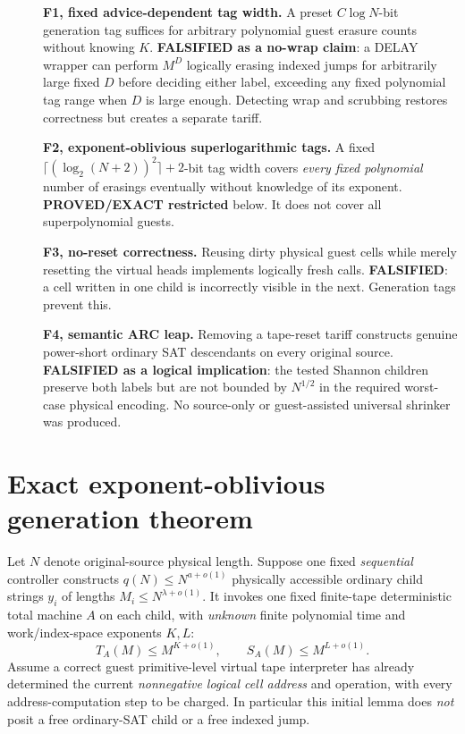 \documentclass[11pt]{article}
\begin{document}
\begin{description}
\item[] \textbf{F1, fixed advice-dependent tag width.} A preset $C\log N$-bit generation tag suffices for arbitrary polynomial guest erasure counts without knowing $K$. \textbf{FALSIFIED as a no-wrap claim}: a DELAY wrapper can perform $M^D$ logically erasing indexed jumps for arbitrarily large fixed $D$ before deciding either label, exceeding any fixed polynomial tag range when $D$ is large enough. Detecting wrap and scrubbing restores correctness but creates a separate tariff.
\item[] \textbf{F2, exponent-oblivious superlogarithmic tags.} A fixed $\lceil(\log_2(N+2))^2\rceil+2$-bit tag width covers \emph{every fixed polynomial} number of erasings eventually without knowledge of its exponent. \textbf{PROVED/EXACT restricted} below. It does not cover all superpolynomial guests.
\item[] \textbf{F3, no-reset correctness.} Reusing dirty physical guest cells while merely resetting the virtual heads implements logically fresh calls. \textbf{FALSIFIED}: a cell written in one child is incorrectly visible in the next. Generation tags prevent this.
\item[] \textbf{F4, semantic ARC leap.} Removing a tape-reset tariff constructs genuine power-short ordinary SAT descendants on every original source. \textbf{FALSIFIED as a logical implication}: the tested Shannon children preserve both labels but are not bounded by $N^{1/2}$ in the required worst-case physical encoding. No source-only or guest-assisted universal shrinker was produced.
\end{description}

\section{Exact exponent-oblivious generation theorem}
Let $N$ denote original-source physical length. Suppose one fixed \emph{sequential} controller constructs $q(N)\le N^{a+o(1)}$ physically accessible ordinary child strings $y_i$ of lengths $M_i\le N^{\lambda+o(1)}$. It invokes one fixed finite-tape deterministic total machine $A$ on each child, with \emph{unknown} finite polynomial time and work/index-space exponents $K,L$:
\[
T_A(M)\le M^{K+o(1)},\qquad S_A(M)\le M^{L+o(1)}.
\]
Assume a correct guest primitive-level virtual tape interpreter has already determined the current \emph{nonnegative logical cell address} and operation, with every address-computation step to be charged. In particular this initial lemma does \emph{not} posit a free ordinary-SAT child or a free indexed jump.
\end{document}
